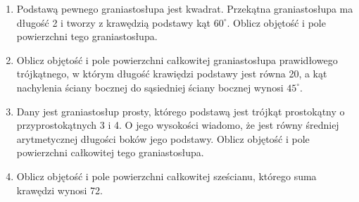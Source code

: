 \documentclass[12pt,a4paper]{article}
\begin{document}
\begin{enumerate}[1.]
	\item Podstawą pewnego graniastosłupa jest kwadrat. Przekątna graniastosłupa ma długość 2 i tworzy z krawędzią podstawy kąt $60^\circ$. Oblicz objętość i pole powierzchni tego graniastosłupa.
	
	\item Oblicz objętość i pole powierzchni całkowitej graniastosłupa prawidłowego trójkątnego, w którym długość krawiędzi podstawy jest równa 20, a kąt nachylenia ściany bocznej do sąsiedniej ściany bocznej wynosi $45^\circ$.
	
	\item Dany jest graniastosłup prosty, którego podstawą jest trójkąt prostokątny o przyprostokątnych 3 i 4. O jego wysokości wiadomo, że jest równy średniej arytmetycznej długości boków jego podstawy. Oblicz objętość i pole powierzchni całkowitej tego graniastosłupa.
	
	\item Oblicz objętość i pole powierzchni całkowitej sześcianu, którego suma krawędzi wynosi 72.
\end{enumerate}
	
	
	
\end{document}

